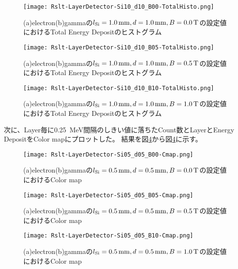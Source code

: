 \documentclass[a4paper,10pt]{jreport}
\begin{document}
\begin{figure}[H]
	\center
	\texttt{[image: Rslt-LayerDetector-Si10\_d10\_B00-TotalHisto.png]}
	\caption{(a)electron(b)gammaの$l_{\rm{Si}}=\SI{1.0}{mm}, d=\SI{1.0}{mm}, B=\SI{0.0}{T}$の設定値におけるTotal Energy Depositのヒストグラム}
	\label{Rslt-LayerDetector-Si10_d10_B00-TotalHisto}
\end{figure}

\begin{figure}[H]
	\center
	\texttt{[image: Rslt-LayerDetector-Si10\_d10\_B05-TotalHisto.png]}
	\caption{(a)electron(b)gammaの$l_{\rm{Si}}=\SI{1.0}{mm}, d=\SI{1.0}{mm}, B=\SI{0.5}{T}$の設定値におけるTotal Energy Depositのヒストグラム}
	\label{Rslt-LayerDetector-Si10_d10_B05-TotalHisto}
\end{figure}

\begin{figure}[H]
	\center
	\texttt{[image: Rslt-LayerDetector-Si10\_d10\_B10-TotalHisto.png]}
	\caption{(a)electron(b)gammaの$l_{\rm{Si}}=\SI{1.0}{mm}, d=\SI{1.0}{mm}, B=\SI{1.0}{T}$の設定値におけるTotal Energy Depositのヒストグラム}
	\label{Rslt-LayerDetector-Si10_d10_B10-TotalHisto}
\end{figure}

次に、Layer毎に\SI{0.25}{MeV}間隔のしきい値に落ちたCount数とLayerとEnergy DepositをColor mapにプロットした。
結果を図\ref{Rslt-LayerDetector-Si05_d05_B00-Cmap}から図\ref{Rslt-LayerDetector-Si05_d05_B00-Cmap}に示す。

\begin{figure}[H]
	\center
	\texttt{[image: Rslt-LayerDetector-Si05\_d05\_B00-Cmap.png]}
	\caption{(a)electron(b)gammaの$l_{\rm{Si}}=\SI{0.5}{mm}, d=\SI{0.5}{mm}, B=\SI{0.0}{T}$の設定値におけるColor map}
	\label{Rslt-LayerDetector-Si05_d05_B00-Cmap}
\end{figure}

\begin{figure}[H]
	\center
	\texttt{[image: Rslt-LayerDetector-Si05\_d05\_B05-Cmap.png]}
	\caption{(a)electron(b)gammaの$l_{\rm{Si}}=\SI{0.5}{mm}, d=\SI{0.5}{mm}, B=\SI{0.5}{T}$の設定値におけるColor map}
	\label{Rslt-LayerDetector-Si05_d05_B05-Cmap}
\end{figure}

\begin{figure}[H]
	\center
	\texttt{[image: Rslt-LayerDetector-Si05\_d05\_B10-Cmap.png]}
	\caption{(a)electron(b)gammaの$l_{\rm{Si}}=\SI{0.5}{mm}, d=\SI{0.5}{mm}, B=\SI{1.0}{T}$の設定値におけるColor map}
	\label{Rslt-LayerDetector-Si05_d05_B10-Cmap}
\end{figure}
\end{document}
